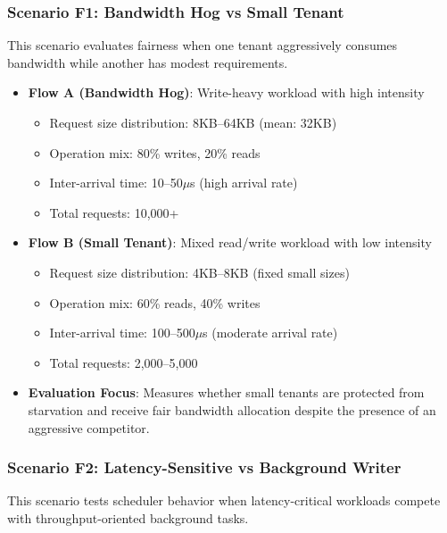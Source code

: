 \documentclass[11pt]{article}
\begin{document}
\subsubsection{Scenario F1: Bandwidth Hog vs Small Tenant}

This scenario evaluates fairness when one tenant aggressively consumes bandwidth while another has modest requirements.

\begin{itemize}
    \item \textbf{Flow A (Bandwidth Hog)}: Write-heavy workload with high intensity
    \begin{itemize}
        \item Request size distribution: 8KB--64KB (mean: 32KB)
        \item Operation mix: 80\% writes, 20\% reads
        \item Inter-arrival time: 10--50$\mu$s (high arrival rate)
        \item Total requests: 10,000+
    \end{itemize}
    \item \textbf{Flow B (Small Tenant)}: Mixed read/write workload with low intensity
    \begin{itemize}
        \item Request size distribution: 4KB--8KB (fixed small sizes)
        \item Operation mix: 60\% reads, 40\% writes
        \item Inter-arrival time: 100--500$\mu$s (moderate arrival rate)
        \item Total requests: 2,000--5,000
    \end{itemize}
    \item \textbf{Evaluation Focus}: Measures whether small tenants are protected from starvation and receive fair bandwidth allocation despite the presence of an aggressive competitor.
\end{itemize}

\subsubsection{Scenario F2: Latency-Sensitive vs Background Writer}

This scenario tests scheduler behavior when latency-critical workloads compete with throughput-oriented background tasks.
\end{document}

